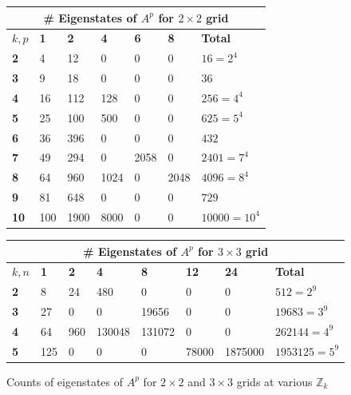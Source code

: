 \documentclass[11pt]{article}
\newcommand{\modZ}[1]{$\mathbb{Z}_{#1}$}
\begin{document}
\begin{figure}[H]
  \caption{Counts of eigenstates of $A^p$ for $2 \times 2$ and $3 \times 3$ grids at various \modZ{k}}
  \label{eigencounts}

  \begin{center}
  \begin{tabular}{|l|l|l|l|l|l|l|}
    \hline
    \multicolumn{7}{|c|}{\# Eigenstates of $A^p$ for $2 \times 2$ grid} \\ \hline
    $k, p$&\textbf{1}&\textbf{2}&\textbf{4}&\textbf{6}&\textbf{8}&\textbf{Total}\\ \hline
    \textbf{2}  & 4   & 12   & 0    & 0    & 0    & $16=2^4$ \\ \hline
    \textbf{3}  & 9   & 18   & 0    & 0    & 0    & $36$ \\ \hline
    \textbf{4}  & 16  & 112  & 128  & 0    & 0    & $256=4^4$ \\ \hline
    \textbf{5}  & 25  & 100  & 500  & 0    & 0    & $625=5^4$ \\ \hline
    \textbf{6}  & 36  & 396  & 0    & 0    & 0    & $432$ \\ \hline
    \textbf{7}  & 49  & 294  & 0    & 2058 & 0    & $2401=7^4$ \\ \hline
    \textbf{8}  & 64  & 960  & 1024 & 0    & 2048 & $4096=8^4$ \\ \hline
    \textbf{9}  & 81  & 648  & 0    & 0    & 0    & $729$ \\ \hline
    \textbf{10} & 100 & 1900 & 8000 & 0    & 0    & $10000=10^4$ \\ \hline
  \end{tabular}
  \vspace{0.5cm}

  \begin{tabular}{|l|l|l|l|l|l|l|l|}
    \hline
    \multicolumn{8}{|c|}{\# Eigenstates of $A^p$ for $3 \times 3$ grid} \\ \hline
    $k, n$&\textbf{1}&\textbf{2}&\textbf{4}&\textbf{8}&\textbf{12}&\textbf{24}&\textbf{Total}\\ \hline
    \textbf{2}  & 8   & 24   & 480    & 0      & 0     & 0       & $512=2^9$ \\ \hline
    \textbf{3}  & 27  & 0    & 0      & 19656  & 0     & 0       & $19683=3^9$ \\ \hline
    \textbf{4}  & 64  & 960  & 130048 & 131072 & 0     & 0       & $262144=4^9$ \\ \hline
    \textbf{5}  & 125 & 0    & 0      & 0      & 78000 & 1875000 & $1953125=5^9$ \\ \hline
  \end{tabular}
  \end{center}
\end{figure}
\end{document}
